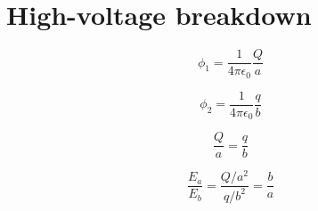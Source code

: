 \section{High-voltage breakdown}

\begin{equation*}
  \phi_1 = \frac{1}{4\pi\epsilon_0} \frac{Q}{a}
\end{equation*}

\begin{equation*}
  \phi_2 = \frac{1}{4\pi\epsilon_0} \frac{q}{b}
\end{equation*}

\begin{equation*}
  \frac{Q}{a} = \frac{q}{b}
\end{equation*}

\begin{equation}
  \frac{E_a}{E_b} = \frac{Q / a^2}{q / b^2} = \frac{b}{a}
\end{equation}


